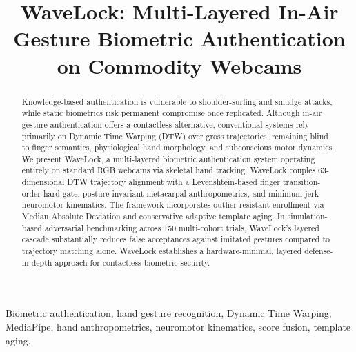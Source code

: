 \documentclass[conference]{IEEEtran}
\begin{document}
\title{WaveLock: Multi-Layered In-Air Gesture Biometric Authentication on Commodity Webcams}

\author{
}

\maketitle

\begin{abstract}
Knowledge-based authentication is vulnerable to shoulder-surfing and smudge attacks, while static biometrics risk permanent compromise once replicated. Although in-air gesture authentication offers a contactless alternative, conventional systems rely primarily on Dynamic Time Warping (DTW) over gross trajectories, remaining blind to finger semantics, physiological hand morphology, and subconscious motor dynamics. We present WaveLock, a multi-layered biometric authentication system operating entirely on standard RGB webcams via skeletal hand tracking. WaveLock couples 63-dimensional DTW trajectory alignment with a Levenshtein-based finger transition-order hard gate, posture-invariant metacarpal anthropometrics, and minimum-jerk neuromotor kinematics. The framework incorporates outlier-resistant enrollment via Median Absolute Deviation and conservative adaptive template aging. In simulation-based adversarial benchmarking across 150 multi-cohort trials, WaveLock's layered cascade substantially reduces false acceptances against imitated gestures compared to trajectory matching alone. WaveLock establishes a hardware-minimal, layered defense-in-depth approach for contactless biometric security.\end{abstract}

\begin{IEEEkeywords}
Biometric authentication, hand gesture recognition, Dynamic Time Warping, MediaPipe, hand anthropometrics, neuromotor kinematics, score fusion, template aging.
\end{IEEEkeywords}
\end{document}
